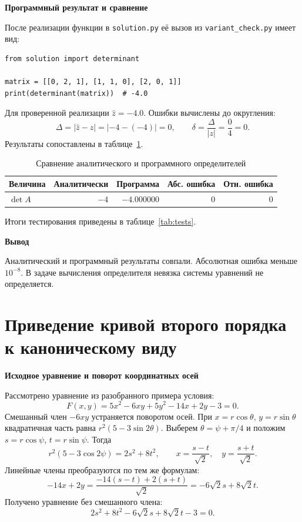 \documentclass[12pt,a4paper]{article}
\newcommand{\taskhead}[1]{\par\textbf{#1}\par}
\begin{document}
\taskhead{Программный результат и сравнение}
После реализации функции в \texttt{solution.py} её вызов
из \texttt{variant\_check.py} имеет вид:
\begin{lstlisting}[style=commands]
from solution import determinant

matrix = [[0, 2, 1], [1, 1, 0], [2, 0, 1]]
print(determinant(matrix))  # -4.0
\end{lstlisting}
Для проверенной реализации $\widehat z=-4.0$. Ошибки вычислены
до округления:
\[
\Delta=|\widehat z-z|=|-4-(-4)|=0,\qquad
\delta=\frac{\Delta}{|z|}=\frac{0}{4}=0.
\]
Результаты сопоставлены в таблице~\ref{tab:errors}.
\begin{table}[htbp]
\centering
\caption{Сравнение аналитического и программного определителей}
\label{tab:errors}
\begin{tabular}{|l|r|r|r|r|}\hline
Величина & Аналитически & Программа & Абс. ошибка & Отн. ошибка\\\hline
$\det A$ & $-4$ & $-4.000000$ & $0$ & $0$\\\hline
\end{tabular}
\end{table}

Итоги тестирования приведены в таблице~\ref{tab:tests}.

\taskhead{Вывод} 

Аналитический и программный результаты совпали.
Абсолютная ошибка меньше $10^{-8}$. В задаче вычисления определителя
невязка системы уравнений не определяется.

\clearpage
\endgroup
\section{Приведение кривой второго порядка к каноническому виду}
\taskhead{Исходное уравнение и поворот координатных осей}
Рассмотрено уравнение из разобранного примера условия:
\[
F(x,y)=5x^2-6xy+5y^2-14x+2y-3=0.
\]
Смешанный член $-6xy$ устраняется поворотом осей.
При $x=r\cos\theta$, $y=r\sin\theta$ квадратичная часть равна
$r^2(5-3\sin2\theta)$.
Выберем $\theta=\psi+\pi/4$ и положим
$s=r\cos\psi$, $t=r\sin\psi$. Тогда
\[
r^2(5-3\cos2\psi)=2s^2+8t^2,\qquad
x=\frac{s-t}{\sqrt2},\quad y=\frac{s+t}{\sqrt2}.
\]
Линейные члены преобразуются по тем же формулам:
\[
-14x+2y=\frac{-14(s-t)+2(s+t)}{\sqrt2}
=-6\sqrt2s+8\sqrt2t.
\]
Получено уравнение без смешанного члена:
\[
2s^2+8t^2-6\sqrt2s+8\sqrt2t-3=0.
\]
\end{document}
